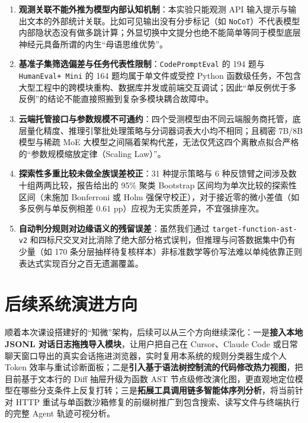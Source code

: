 \begin{enumerate}
  \item \textbf{观测关联不能外推为模型内部认知机制}：本实验只能观测 API 输入提示与输出文本的外部统计关联。比如可见输出没有分步标记（如 \texttt{NoCoT}）不代表模型内部隐状态没有做多跳计算；外显切换中文提分也绝不能简单等同于模型底层神经元具备所谓的内生“母语思维优势”。
  \item \textbf{基准子集筛选偏差与任务代表性限制}：\texttt{CodePromptEval} 的 194 题与 \texttt{HumanEval+ Mini} 的 164 题均属于单文件或受控 Python 函数级任务，不包含大型工程中的跨模块重构、数据库并发或前端交互调试；因此“单反例优于多反例”的结论不能直接照搬到复杂多模块耦合故障中。
  \item \textbf{云端托管接口与参数规模不可通约}：四个受测模型由不同云端服务商托管，底层量化精度、推理引擎批处理策略与分词器词表大小均不相同；且稠密 7B/8B 模型与稀疏 MoE 大模型之间隔着架构代差，无法仅凭这四个离散点拟合严格的“参数规模缩放定律（Scaling Law）”。
  \item \textbf{探索性多重比较未做全族误差校正}：31 种提示策略与 6 种反馈臂之间涉及数十组两两比较，报告给出的 95\% 聚类 Bootstrap 区间均为单次比较的探索性区间（未施加 Bonferroni 或 Holm 强保守校正），对于接近零的微小差值（如多反例与单反例相差 $0.61\text{ pp}$）应视为无实质差异，不宜强排座次。
  \item \textbf{自动判分规则对边缘语义的残留误差}：虽然我们通过 \texttt{target-function-ast-v2} 和四标尺交叉对比消除了绝大部分格式误判，但推理与问答数据集中仍有少量（如 170 条分层抽样待复核样本）非标准数学等价写法难以单纯依靠正则表达式实现百分之百无遗漏覆盖。
\end{enumerate}

\section{后续系统演进方向}

顺着本次课设搭建好的“知微”架构，后续可以从三个方向继续深化：一是\textbf{接入本地 JSONL 对话日志拖拽导入模块}，让用户把自己在 Cursor、Claude Code 或日常聊天窗口导出的真实会话拖进浏览器，实时复用本系统的规则分类器生成个人 Token 效率与重试诊断面板；二是\textbf{引入基于语法树控制流的代码修改热力视图}，把目前基于文本行的 Diff 抽屉升级为函数 AST 节点级修改演化图，更直观地定位模型在哪些分支条件上反复打转；三是\textbf{拓展工具调用链多智能体序列分析}，将当前针对 HTTP 重试与单函数沙箱修复的前缀树推广到包含搜索、读写文件与终端执行的完整 Agent 轨迹可视分析。
